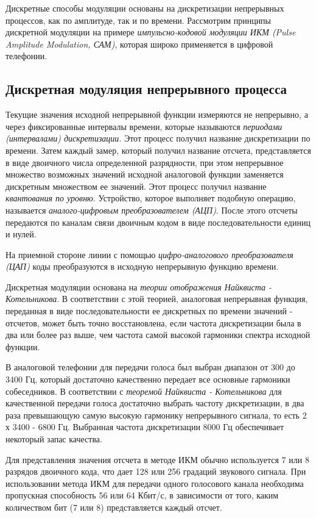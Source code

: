 Дискретные способы модуляции основаны на дискретизации непрерывных процессов, как по амплитуде, так и по времени.
Рассмотрим принципы дискретной модуляции на примере \emph{импульсно-кодовой модуляции ИКМ (Pulse Amplitude Modulation, САМ)}, которая широко применяется в цифровой телефонии.

\subsection{Дискретная модуляция непрерывного процесса}

Текущие значения исходной непрерывной функции измеряются не непрерывно, а через фиксированные интервалы времени, которые называются \emph{периодами (интервалами) дискретизации}.
Этот процесс получил название дискретизации по времени.
Затем каждый замер, который получил название отсчета, представляется в виде двоичного числа определенной разрядности, при этом непрерывное множество возможных значений исходной аналоговой функции заменяется дискретным множеством ее значений.
Этот процесс получил название \emph{квантования по уровню}.
Устройство, которое выполняет подобную операцию, называется \emph{аналого-цифровым преобразователем (АЦП)}.
После этого отсчеты передаются по каналам связи двоичным кодом в виде последовательности единиц и нулей.

На приемной стороне линии с помощью \emph{цифро-аналогового преобразователя (ЦАП)} коды преобразуются в исходную непрерывную функцию времени.

Дискретная модуляции основана на \emph{теории отображения Найквиста - Котельникова}.
В соответствии с этой теорией, аналоговая непрерывная функция, переданная в виде последовательности ее дискретных по времени значений - отсчетов, может быть точно восстановлена, если частота дискретизации была в два или более раз выше, чем частота самой высокой гармоники спектра исходной функции.

В аналоговой телефонии для передачи голоса был выбран диапазон от 300 до 3400 Гц, который достаточно качественно передает все основные гармоники собеседников.
В соответствии с \emph{теоремой Найквиста - Котельникова} для качественной передачи голоса достаточно выбрать частоту дискретизации, в два раза превышающую самую высокую гармонику непрерывного сигнала, то есть 2 х 3400 - 6800 Гц.
Выбранная частота дискретизации 8000 Гц обеспечивает некоторый запас качества.

Для представления значения отсчета в методе ИКМ обычно используется 7 или 8 разрядов двоичного кода, что дает 128 или 256 градаций звукового сигнала.
При использовании метода ИКМ для передачи одного голосового канала необходима пропускная способность 56 или 64 Кбит/с, в зависимости от того, каким количеством бит (7 или 8) представляется каждый отсчет.

